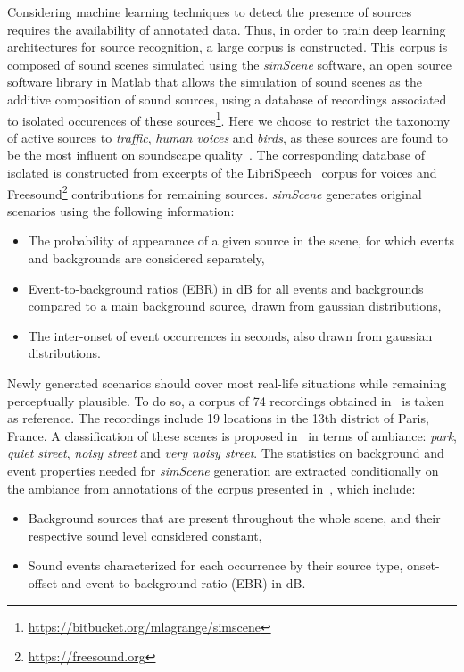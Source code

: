 \documentclass[twocolumn]{article}
\begin{document}
Considering machine learning techniques to detect the presence of sources requires the availability of annotated data. Thus, in order to train deep learning architectures for source recognition, a large corpus is constructed. This corpus is composed of sound scenes simulated using the \textit{simScene} software, an open source software library in Matlab that allows the simulation of sound scenes as the additive composition of sound sources, using a database of recordings associated to isolated occurences of these sources\footnote{\url{https://bitbucket.org/mlagrange/simscene}}. Here we choose to restrict the taxonomy of active sources to \textit{traffic}, \textit{human voices} and \textit{birds}, as these sources are found to be the most influent on soundscape quality~\cite{lavandier2006}. The corresponding database of isolated is constructed from excerpts of the LibriSpeech~\cite{panayotov2015} corpus for voices and Freesound\footnote{\url{https://freesound.org}} contributions for remaining sources. \textit{simScene} generates original scenarios using the following information:

\begin{itemize}
\item The probability of appearance of a given source in the scene, for which events and backgrounds are considered separately,
\item Event-to-background ratios (EBR) in dB for all events and backgrounds compared to a main background source, drawn from gaussian distributions,
\item The inter-onset of event occurrences in seconds, also drawn from gaussian distributions.
\end{itemize}

Newly generated scenarios should cover most real-life situations while remaining perceptually plausible. To do so, a corpus of 74 recordings obtained in~\cite{aumond2017} is taken as reference. The recordings include 19 locations in the 13th district of Paris, France. A classification of these scenes is proposed in~\cite{gloaguen2017} in terms of ambiance: \textit{park}, \textit{quiet street}, \textit{noisy street} and \textit{very noisy street}. The statistics on background and event properties needed for \textit{simScene} generation are extracted conditionally on the ambiance from annotations of the corpus presented in~\cite{gloaguen2017}, which include:

\begin{itemize}
\item Background sources that are present throughout the whole scene, and their respective sound level considered constant,
\item Sound events characterized for each occurrence by their source type, onset-offset and event-to-background ratio (EBR) in dB.
\end{itemize}
\end{document}
